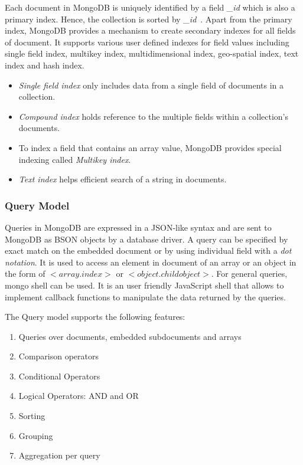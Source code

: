 Each document in MongoDB is uniquely identified by a field \textit{\_id} which is also a primary index. Hence, the collection is sorted by \textit{\_id}~\citep{nosql/comparision}.
Apart from the primary index, MongoDB provides a mechanism to create secondary indexes for all fields of document. It supports various user defined indexes for field values including single field index, multikey index, multidimensional index, geo-spatial index, text index and hash index.
\begin{itemize}
\item \textit{Single field index} only includes data from a single field of documents in a collection. 
\item \textit{Compound index} holds reference to the multiple fields within a collection's documents.
\item To index a field that contains an array value, MongoDB provides special indexing called \textit{Multikey index}.
\item \textit{Text index} helps efficient search of a string in documents.
\end{itemize}
\subsubsection{Query Model}\label{mongo-query-model}

Queries in MongoDB are expressed in a JSON-like syntax and are sent to MongoDB as BSON objects by a database driver\citep{orend2010analysis}. A query can be specified by exact match on the embedded document or by using individual field with a \textit{dot notation}. It is used to access an element in document of an array or an object in the form of  $<$$array$.$index$$>$ or  $<$$object$.$childobject$$>$. For general queries, mongo shell can be used. It is an user friendly JavaScript shell that allows to implement callback functions to manipulate the data returned by the queries.  
\par
The Query model supports the following features:
\begin{enumerate}
	\item Queries over documents, embedded subdocuments and arrays
	\item Comparison operators
	\item Conditional Operators
	\item Logical Operators: AND and OR
	\item Sorting 
	\item Grouping
	\item Aggregation per query
\end{enumerate}

